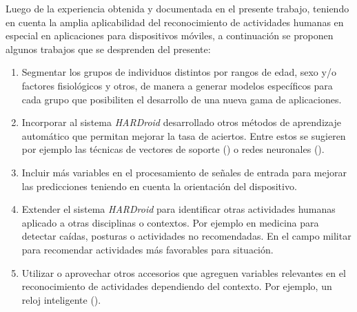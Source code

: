 \label{sec82:trabajos-futuros}Luego de la experiencia obtenida y
documentada en el presente trabajo, teniendo en cuenta la amplia aplicabilidad
del reconocimiento de actividades humanas en especial en aplicaciones
para dispositivos móviles, a continuación se proponen algunos trabajos
que se desprenden del presente:
\begin{enumerate}
\item Segmentar los grupos de individuos distintos por rangos de edad, sexo
y/o factores fisiológicos y otros, de manera a generar modelos específicos
para cada grupo que posibiliten el desarrollo de una nueva gama de
aplicaciones. 
\item Incorporar al sistema \emph{HARDroid} desarrollado otros métodos de
aprendizaje automático que permitan mejorar la tasa de aciertos. Entre
estos se sugieren por ejemplo las técnicas de vectores de soporte
() o redes neuronales ().
\item Incluir más variables en el procesamiento de señales de entrada para
mejorar las predicciones teniendo en cuenta la orientación del dispositivo. 
\item Extender el sistema \emph{HARDroid} para identificar otras actividades
humanas aplicado a otras disciplinas o contextos. Por ejemplo en medicina
para detectar caídas, posturas o actividades no recomendadas. En el
campo militar para recomendar actividades más favorables para situación.
\item Utilizar o aprovechar otros accesorios que agreguen variables relevantes
en el reconocimiento de actividades dependiendo del contexto. Por
ejemplo, un reloj inteligente ().
\end{enumerate}

